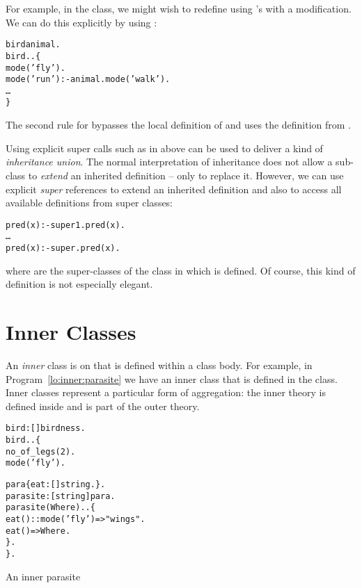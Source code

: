 For example, in the  class, we might wish to redefine  using 's  with a modification. We can do this explicitly by using :
\begin{alltt}
bird\classarrow{}animal.
bird..\{
  mode('fly').
  mode('run') :- animal.mode('walk').
  \ldots
\}
\end{alltt}
The second rule for  bypasses the local definition of  and uses the definition from . 

\begin{aside}
Using explicit super calls such as in  above can be used to deliver a kind of \emph{inheritance union}. The normal interpretation of inheritance does not allow a sub-class to \emph{extend} an inherited definition -- only to replace it. However, we can use explicit \emph{super} references to extend an inherited definition and also to access all available definitions from super classes:
\begin{alltt}
pred(x) :- super\sub1.pred(x).
\ldots
pred(x) :- super\subn.pred(x).
\end{alltt}
where  are the super-classes of the class in which  is defined. Of course, this kind of definition is not especially elegant.
\end{aside}

\section{Inner Classes}
\label{lo:inner}
An \emph{inner} class is on that is defined within a class body. For example, in Program~\vref{lo:inner:parasite} we have an inner  class that is defined in the  class. Inner classes represent a particular form of aggregation: the inner theory is defined inside and is part of the outer theory.

\begin{program}
\vspace{0.5ex}
\begin{boxed}
\begin{alltt}
bird:[]\conarrow{}birdness.
bird..\{
  no_of_legs(2).
  mode('fly').
  
  para\impl{}\{ eat:[]\funarrow{}string. \}.
  parasite:[string]\conarrow{}para.
  parasite(Where)..\{
    eat()::mode('fly')=>"wings".
    	eat()=>Where.
  \}.
\}.
\end{alltt}
\vspace{-2ex}
\end{boxed}
\caption{An inner parasite}
\label{lo:inner:parasite}
\end{program}

